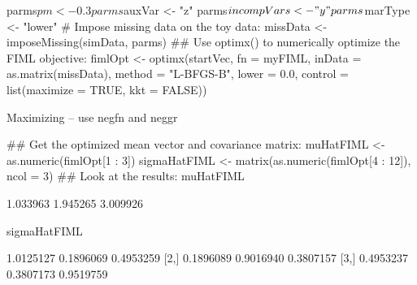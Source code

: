 \begin{Schunk}
\begin{Sinput}
 parms$pm <- 0.3
 parms$auxVar <- "z"
 parms$incompVars <- "y"
 parms$marType <- "lower"
 # Impose missing data on the toy data:
 missData <- imposeMissing(simData, parms)
 ## Use optimx() to numerically optimize the FIML objective:
 fimlOpt <- optimx(startVec,
                   fn = myFIML,
                   inData = as.matrix(missData),
                   method = "L-BFGS-B",
                   lower = 0.0,
                   control = list(maximize = TRUE,
                       kkt = FALSE))
\end{Sinput}
\begin{Soutput}
Maximizing -- use negfn and neggr
\end{Soutput}
\begin{Sinput}
 ## Get the optimized mean vector and covariance matrix:
 muHatFIML <- as.numeric(fimlOpt[1 : 3])
 sigmaHatFIML <-
     matrix(as.numeric(fimlOpt[4 : 12]), ncol = 3)
 ## Look at the results:
 muHatFIML
\end{Sinput}
\begin{Soutput}
[1] 1.033963 1.945265 3.009926
\end{Soutput}
\begin{Sinput}
 sigmaHatFIML
\end{Sinput}
\begin{Soutput}
          [,1]      [,2]      [,3]
[1,] 1.0125127 0.1896069 0.4953259
[2,] 0.1896089 0.9016940 0.3807157
[3,] 0.4953237 0.3807173 0.9519759
\end{Soutput}
\end{Schunk}
